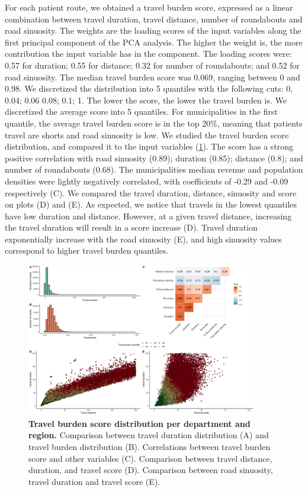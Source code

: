 For each patient route, we obtained a travel burden score, expressed as a linear
combination between travel duration, travel distance, number of roundabouts and
road sinuosity. The weights are the loading scores of the input variables along
the first principal component of the PCA analysis. The higher the weight is, the
more contribution the input variable has in the component. The loading scores
were: 0.57 for duration; 0.55 for distance; 0.32 for number of roundabouts; and
0.52 for road sinuosity. The median travel burden score was 0.069, ranging
between 0 and 0.98. We discretized the distribution into 5 quantiles with the
following cuts: 0, 0.04; 0.06 0.08; 0.1; 1. The lower the score, the lower the
travel burden is. We discretized the average score into 5 quantiles. For
municipalities in the first quantile, the average travel burden score is in the
top 20\%, meaning that patients travel are shorts and road sinuosity is low.
We studied the travel burden score distribution, and compared it to the input
variables (\cref{fig:routes-burden-distribution}). The score has a strong
positive correlation with road sinuosity (0.89); duration (0.85);
distance (0.8); and number of roundabouts (0.68). The municipalities
median revenue and population densities were lightly negatively correlated,
with coefficients of -0.29 and -0.09 respectively (C). We compared the travel
duration, distance, sinuosity and score on plots (D) and (E). As expected,
we notice that travels in the lowest quantiles have low duration and distance.
However, at a given travel distance, increasing the travel duration will result
in a score increase (D). Travel duration exponentially increase with the road
sinuosity (E), and high sinuosity values correspond to higher travel burden
quantiles.

\begin{figure}[h!]
    \includegraphics[width=0.9\textwidth]{images/routes/sup_fig_3.png}
    \centering
    \caption{
        \textbf{Travel burden score distribution per department and region.}
        Comparison between travel duration distribution (A) and travel burden
        distribution (B). Correlations between travel burden score and other
        variables (C). Comparison between travel distance, duration, and travel
        score (D). Comparison between road sinuosity, travel duration and travel
        score (E).}
    \label{fig:routes-burden-distribution}
\end{figure}

